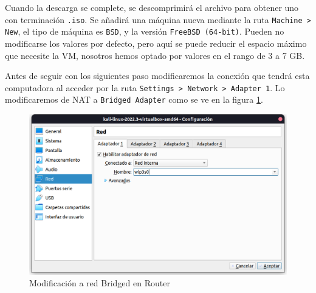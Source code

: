 \documentclass{article}
\begin{document}
            Cuando la descarga se complete, se descomprimirá el archivo para obtener uno con terminación \texttt{.iso}. Se añadirá una máquina nueva mediante la ruta \texttt{Machine > New}, el tipo de máquina es \texttt{BSD}, y la versión \texttt{FreeBSD (64-bit)}. Pueden no modificarse los valores por defecto, pero aquí se puede reducir el espacio máximo que necesite la VM, nosotros hemos optado por valores en el rango de 3 a 7 GB.

            Antes de seguir con los siguientes paso modificaremos la conexión que tendrá esta computadora al acceder por la ruta \texttt{Settings > Network > Adapter 1}. Lo modificaremos de NAT a \texttt{Bridged Adapter} como se ve en la figura \ref{fig:pfsense-bridged-adapter}.
            \begin{figure}
                \centering
                \includegraphics[scale=0.3]{img/pfsense-bridged-adapter.png}
                \caption{Modificación a red Bridged en Router}
                \label{fig:pfsense-bridged-adapter}
            \end{figure}
\end{document}
